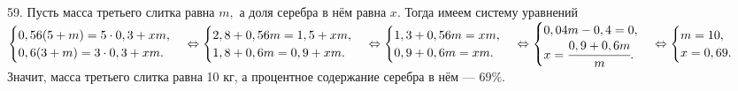 59. Пусть масса третьего слитка равна $m,$ а доля серебра в нём равна $x.$ Тогда имеем систему уравнений $\begin{cases}0,56(5+m)=5\cdot0,3+xm,\\0,6(3+m)=3\cdot0,3+xm.\end{cases}\Leftrightarrow
\begin{cases}2,8+0,56m=1,5+xm,\\ 1,8+0,6m=0,9+xm.\end{cases}\Leftrightarrow
\begin{cases}1,3+0,56m=xm,\\ 0,9+0,6m=xm.\end{cases}\Leftrightarrow
\begin{cases}0,04m-0,4=0,\\ x=\cfrac{0,9+0,6m}{m}.\end{cases}\Leftrightarrow
\begin{cases}m=10,\\ x=0,69.\end{cases}$ Значит, масса третьего слитка равна 10 кг, а процентное содержание серебра в нём --- $69\%.$\\
